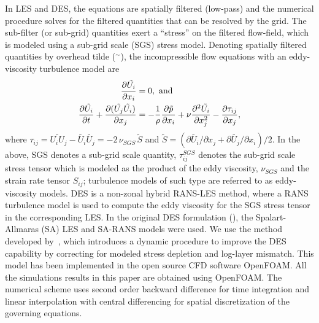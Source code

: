 In LES and DES, the equations are spatially filtered (low-pass) and the
numerical procedure solves for the filtered quantities that can be resolved by
the grid. The sub-filter (or sub-grid) quantities exert a ``stress'' on the
filtered flow-field, which is modeled using a sub-grid scale (SGS) stress
model. Denoting spatially filtered quantities by overhead tilde ($^\sim$), the
incompressible flow equations with an eddy-viscosity turbulence model are
%
\begin{align}
  \frac{\partial{\tilde{U_i}}}{\partial{x_i}}&=0,~{\rm and} \nonumber \\
   \frac{\partial{\tilde{U_i}}}{\partial{t}}+
   \frac{\partial{(\tilde{U_j}\tilde{U_i})}}{\partial{x_j}}
   &=-\frac{1}{\rho}\frac{\partial{\tilde{p}}}{\partial{x_i}}+\nu\frac{\partial{^2\tilde{U_i}}}{\partial{x_j^2}}-\frac{\partial{\tau_{ij}}}{\partial{x_j}},
 \label{eq:geqs}
\end{align}
%
where $\tau_{ij} = \widetilde{U_i U_j}-\tilde{U_i}\tilde{U_j} = -2 \, \nu_{SGS}
\, \tilde{S}$ and $\tilde{S} = (\partial{\tilde{U_i}}/\partial{x_j} +
\partial{\tilde{U_j}}/\partial{x_i})/2$. In the above, SGS denotes a sub-grid
scale quantity, $\tau_{ij}^{SGS}$ denotes the sub-grid scale stress tensor
which is modeled as the product of the eddy viscosity, $\nu_{SGS}$ and the strain
rate tensor $S_{ij}$; turbulence models of such type are referred to as
eddy-viscosity models. DES is a non-zonal hybrid RANS-LES method, where a RANS
turbulence model is used to compute the eddy viscosity for the SGS stress
tensor in the corresponding LES. In the original DES formulation
(\cite{spalart1997comments}), the Spalart-Allmaras (SA) LES and SA-RANS models
were used. We use the method developed by~\cite{yin2015dynamic}, which
introduces a dynamic procedure to improve the DES capability by correcting for
modeled stress depletion and log-layer mismatch. This model has been
implemented in the open source CFD software OpenFOAM. All the simulations
results in this paper are obtained using OpenFOAM. The numerical scheme uses
second order backward difference for time integration and linear interpolation
with central differencing for spatial discretization of the governing
equations.

